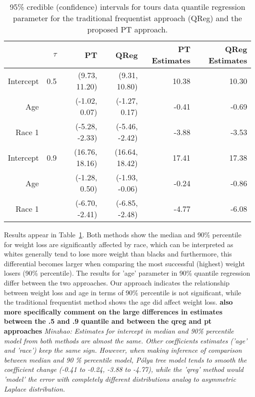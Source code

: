 \documentclass[12pt]{article}
\newcommand{\polya}{P\'{o}lya}
\begin{document}
\begin{table}[h]
  \caption[]{\label{tab:tours} 95\% credible (confidence) intervals for
    tours data quantile regression parameter for the 
    traditional frequentist approach (QReg) and the proposed PT approach.}
  \vspace{4mm}

  \centering
  \begin{tabular}{r|r|rrrr}
    \hline
              & $\tau$ & PT             & QReg           & PT Estimates
              & QReg Estimates                                           \\
    \hline
    Intercept & 0.5    & (9.73, 11.20)  & (9.31, 10.80)  & 10.38 & 10.30 \\
    Age       &        & (-1.02, 0.07)  & (-1.27, 0.17)  & -0.41 & -0.69 \\
    Race 1    &        & (-5.28, -2.33) & (-5.46, -2.42) & -3.88 & -3.53 \\
    \hline
    Intercept & 0.9    & (16.76, 18.16) & (16.64, 18.42) & 17.41 & 17.38 \\
    Age       &        & (-1.28, 0.50)  & (-1.93, -0.06) & -0.24 & -0.86 \\
    Race 1    &        & (-6.70, -2.41) & (-6.85, -2.48) & -4.77 & -6.08 \\
    \hline 
  \end{tabular}
\end{table}

Results appear in Table~\ref{tab:tours}.
Both methods  show the median  
and 90\% percentile for weight loss are significantly  affected by
race, which can be interpreted as whites generally tend to
lose more weight than blacks and furthermore, this differential 
becomes larger when comparing the most successful (highest) weight losers (90\%
percentile). The results for 'age'
parameter in 90\% quantile regression differ between the two
approaches.  Our approach
indicates the relationship between weight loss and age in terms of
90\% percentile is not significant, while the traditional frequentist
method shows the age did affect weight loss.
{\bf also more specifically comment on the large differences in
  estimates between the .5 and .9 quantile and between the qreg and pt
  approaches} 
{\it Minzhao: Estimates for intercept in median and 90\% percentile
  model from both methods are almost the same. Other coefficients
  estimates ('age' and 'race') keep the same sign. However, when
  making inference of comparison between median and 90 \% percentile
  model, \polya{} tree model tends to smooth the coefficient change
  (-0.41 to -0.24, -3.88 to -4.77), while the 'qreg' method would
  'model' the error with completely different distributions analog to
  asymmetric Laplace distribution.}
\end{document}
